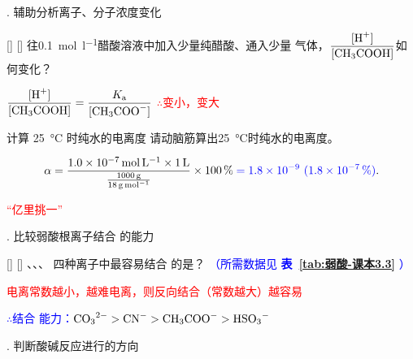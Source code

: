         . 辅助分析离子、分子浓度变化
        
            \begin{xmp}
                {}
                []
                []
                往\SI{0.1}{\mole\per\litre}醋酸溶液中加入少量纯醋酸、通入少量  气体，\( \displaystyle \frac{\cemh{[H+]}}{\cemh{[CH3COOH]}} \)如何变化？

                \( \displaystyle \frac{\cemh{[H+]}}{\cemh{[CH3COOH]}} = \frac{K_\text{a}}{\cemh{[CH3COO^-]}} \)
                \quad\textcolor{red}{\(\therefore\)变小，变大}
            \end{xmp}

            \begin{xmp}{计算 \SI{25}{\degreeCelsius} 时纯水的电离度}
                请动脑筋算出\SI{25}{\degreeCelsius}时纯水的电离度。

                \[
                    \alpha = \frac{\SI{1.0E-7}{\mole\per\litre}\times\SI{1}{\litre}}{\frac{\SI{1000}{\gram}}{\SI{18}{\gram\per\mole}}}\times\SI{100}{\percent} \mathcolor{blue}{= \num{1.8E-9}\ (\SI{1.8E-7}{\percent})}
                .\]

                \textcolor{red}{“亿里挑一”}
            \end{xmp}

        . 比较弱酸根离子结合  的能力

            \begin{xmp}
                {}
                []
                []
                、、、 四种离子中最容易结合  的是？
                \textcolor{blue}{（所需数据见 \textbf{表~\ref{tab:弱酸-课本3.3}} ）}

                \textcolor{red}{电离常数越小，越难电离，则反向结合（常数越大）越容易}

                \textcolor{blue}{\(\therefore\)结合  能力：\(\cemh{CO3^2-}>\cemh{CN^-}>\cemh{CH3COO^-}>\cemh{HSO3^-}\)}
            \end{xmp}

        . 判断酸碱反应进行的方向

